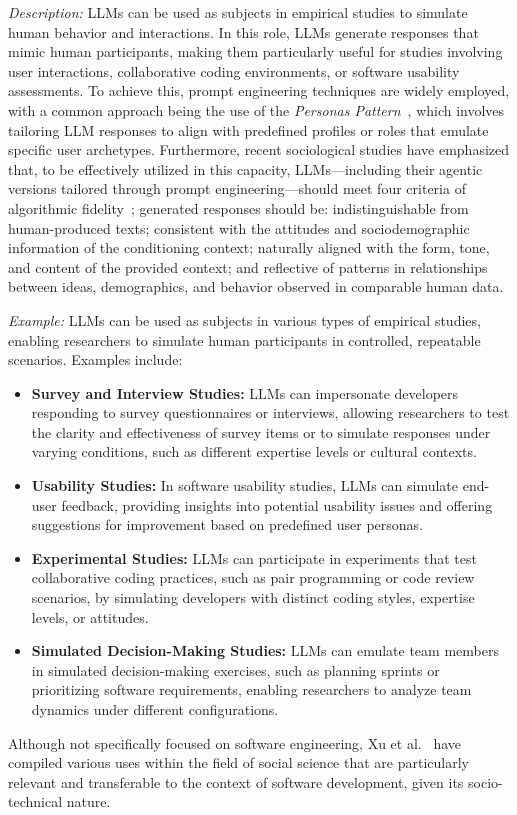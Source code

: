 \documentclass[11pt]{article}
\begin{document}
\emph{Description:} LLMs can be used as subjects in empirical studies to simulate human behavior and interactions. In this role, LLMs generate responses that mimic human participants, making them particularly useful for studies involving user interactions, collaborative coding environments, or software usability assessments. 
To achieve this, prompt engineering techniques are widely employed, with a common approach being the use of the \textit{Personas Pattern}~\cite{DBLP:journals/corr/abs-2308-07702}, which involves tailoring LLM responses to align with predefined profiles or roles that emulate specific user archetypes. 
Furthermore, recent sociological studies have emphasized that, to be effectively utilized in this capacity, LLMs—including their agentic versions tailored through prompt engineering—should meet four criteria of algorithmic fidelity~\cite{DBLP:journals/corr/abs-2209-06899}; generated responses should be: indistinguishable from human-produced texts; consistent with the attitudes and sociodemographic information of the conditioning context; naturally aligned with the form, tone, and content of the provided context; and reflective of patterns in relationships between ideas, demographics, and behavior observed in comparable human data.

\emph{Example:} LLMs can be used as subjects in various types of empirical studies, enabling researchers to simulate human participants in controlled, repeatable scenarios. 
Examples include:
\begin{itemize}
    \item \textbf{Survey and Interview Studies:} LLMs can impersonate developers responding to survey questionnaires or interviews, allowing researchers to test the clarity and effectiveness of survey items or to simulate responses under varying conditions, such as different expertise levels or cultural contexts.
    \item \textbf{Usability Studies:} In software usability studies, LLMs can simulate end-user feedback, providing insights into potential usability issues and offering suggestions for improvement based on predefined user personas.
    \item \textbf{Experimental Studies:} LLMs can participate in experiments that test collaborative coding practices, such as pair programming or code review scenarios, by simulating developers with distinct coding styles, expertise levels, or attitudes.
    \item \textbf{Simulated Decision-Making Studies:} LLMs can emulate team members in simulated decision-making exercises, such as planning sprints or prioritizing software requirements, enabling researchers to analyze team dynamics under different configurations.
\end{itemize}
Although not specifically focused on software engineering, Xu et al.~\cite{DBLP:journals/ipm/XuSRGPLSH24} have compiled various uses within the field of social science that are particularly relevant and transferable to the context of software development, given its socio-technical nature.
\end{document}
